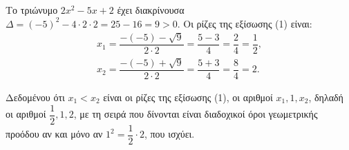 
\begin{alist}
\item Το τριώνυμο $2x^2 - 5x + 2$ έχει διακρίνουσα $\Delta = (-5)^2 - 4 \cdot 2 \cdot 2 = 25 - 16 = 9 > 0$. Οι ρίζες
της εξίσωσης (1) είναι:
\begin{gather*}
x_1 = \dfrac{-(-5) - \sqrt{9}}{2 \cdot 2} = \dfrac{5 - 3}{4} = \dfrac{2}{4} = \dfrac{1}{2}, \\
x_2 = \dfrac{-(-5) + \sqrt{9}}{2 \cdot 2} = \dfrac{5 + 3}{4} = \dfrac{8}{4} = 2.
\end{gather*}

\item Δεδομένου ότι $x_1 < x_2$ είναι οι ρίζες της εξίσωσης (1), οι αριθμοί $x_1, 1, x_2$, δηλαδή οι αριθμοί
$\dfrac{1}{2}, 1, 2$, με τη σειρά που δίνονται είναι διαδοχικοί όροι γεωμετρικής προόδου αν και μόνο αν
$1^2 = \dfrac{1}{2} \cdot 2$, που ισχύει.
\end{alist}

